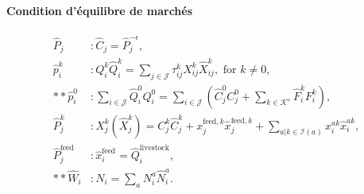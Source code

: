 \paragraph{Condition d'équilibre de marchés}
\begin{align}
	\hat{P}_j               & : \hat{C}_j=\hat{P}_j^{-\epsilon},                                                                                                                        \\
	\hat{p}_i^k             & : Q_i^k \hat{Q}_i^k = \sum_{j \in \mathcal{J}} \tau_{ij}^k X_{ij}^k \hat{X}_{ij}^k, \text{ for } k \neq 0,                                                \\
	** \hat{p}_i^0          & : \sum_{i \in \mathcal{J}} \hat{Q}_i^0 Q_i^0 = \sum_{i \in \mathcal{J}} \left( \hat{C}_j^0 C_j^0  + \sum_{k \in \mathcal{K}^c} \hat{F}_i^k F_i^k \right), \\
	\hat{P}_j^k             & : X_j^k (\hat{X}_j^k) = C_j^k  \hat{C}_j^k + x_j^{\text{feed},k} \hat{x}_j^{\text{feed},k} + \sum_{a | k \in \mathcal{I}(a)} x_i^{ak} \hat{x}_i^{ak},     \\
	\hat{P}_j^{\text{feed}} & :\hat{x}_i^{\text{feed}}=\hat{Q}_i^{\text{livestock}},                                                                                                    \\
	** \hat{W}_i            & : N_i=\sum_a N_i^a \hat{N}_i^a.
\end{align}

